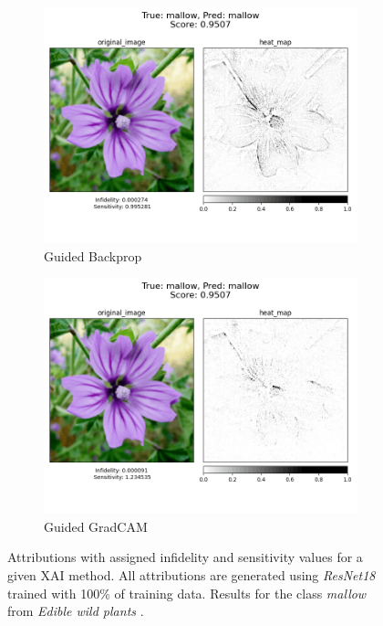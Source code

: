 \begin{figure}[h]
  \centering
 \begin{subfigure}{.45\textwidth}
    \centering
    \includegraphics[width=\textwidth]{results/metrics/107-gbp.png}
    \caption{Guided Backprop}\label{fig:resnet-inf-107-gbp}
\end{subfigure}
 \begin{subfigure}{.45\textwidth}
    \centering
    \includegraphics[width=\textwidth]{results/metrics/107-gradcam.png}
    \caption{Guided GradCAM}\label{fig:resnet-inf-107-gradcam}
\end{subfigure}

 \caption{Attributions with assigned infidelity and sensitivity values for a given XAI method. All attributions are generated using \textit{ResNet18} trained with 100\% of training data.  Results for the class \textit{mallow} from \textit{Edible wild plants} \cite{edible-wild-plants}.}\label{fig:resnet-inf-107}
\end{figure}

